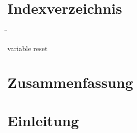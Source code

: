 \documentclass[
fontsize=12pt, 
paper=a4, 
BCOR=10mm, 
twoside=false,
 DIV=10, 
 headsepline, 
 footsepline
 ]{scrartcl}
\begin{document}
\section*{Indexverzeichnis}

\begin{large}
\begin{tabbing}
\hspace{90pt}\=\hspace{200pt}\=\kill

variable reset \> \> \\

\end{tabbing} 
\end{large}

%

%


\pagebreak

\section{Zusammenfassung}

%
%

\section{Einleitung}

\end{document}
